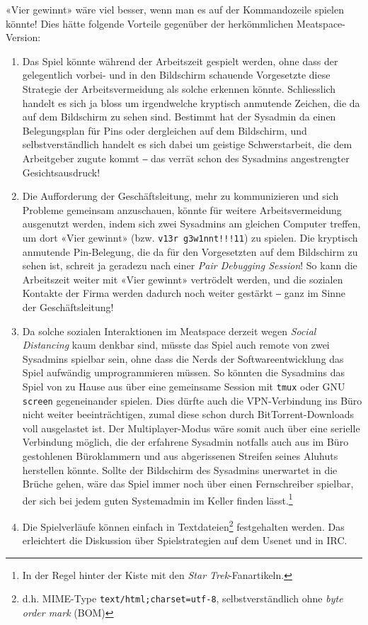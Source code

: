 \documentclass[a4paper,11pt,hidelinks]{scrartcl}
\begin{document}
«Vier gewinnt» wäre viel besser, wenn man es auf der Kommandozeile spielen könnte! Dies hätte folgende Vorteile gegenüber der herkömmlichen Meatspace-Version:

\begin{enumerate}
    \item Das Spiel könnte während der Arbeitszeit gespielt werden, ohne dass der gelegentlich vorbei- und in den Bildschirm schauende Vorgesetzte diese Strategie der Arbeitsvermeidung als solche erkennen könnte. Schliesslich handelt es sich ja bloss um irgendwelche kryptisch anmutende Zeichen, die da auf dem Bildschirm zu sehen sind. Bestimmt hat der Sysadmin da einen Belegungsplan für Pins oder dergleichen auf dem Bildschirm, und selbstverständlich handelt es sich dabei um geistige Schwerstarbeit, die dem Arbeitgeber zugute kommt ‒ das verrät schon des Sysadmins angestrengter Gesichtsausdruck!
    \item Die Aufforderung der Geschäftsleitung, mehr zu kommunizieren und sich Probleme gemeinsam anzuschauen, könnte für weitere Arbeitsvermeidung ausgenutzt werden, indem sich zwei Sysadmins am gleichen Computer treffen, um dort «Vier gewinnt» (bzw. \texttt{v13r g3w1nnt!!!11}) zu spielen. Die kryptisch anmutende Pin-Be\-le\-gung, die da für den Vorgesetzten auf dem Bildschirm zu sehen ist, schreit ja geradezu nach einer \textit{Pair Debugging Session}! So kann die Arbeitszeit weiter mit «Vier gewinnt» vertrödelt werden, und die sozialen Kontakte der Firma werden dadurch noch weiter gestärkt ‒ ganz im Sinne der Geschäftsleitung!
    \item Da solche sozialen Interaktionen im Meatspace derzeit wegen \textit{Social Distancing} kaum denkbar sind, müsste das Spiel auch remote von zwei Sysadmins spielbar sein, ohne dass die Nerds der Softwareentwicklung das Spiel aufwändig umprogrammieren müssen. So könnten die Sysadmins das Spiel von zu Hause aus über eine gemeinsame Session mit \texttt{tmux} oder GNU \texttt{screen} gegeneinander spielen. Dies dürfte auch die VPN-Verbindung ins Büro nicht weiter beeinträchtigen, zumal diese schon durch BitTorrent-Downloads voll ausgelastet ist. Der Multiplayer-Modus wäre somit auch über eine serielle Verbindung möglich, die der erfahrene Sysadmin notfalls auch aus im Büro gestohlenen Büroklammern und aus abgerissenen Streifen seines Aluhuts herstellen könnte. Sollte der Bildschirm des Sysadmins unerwartet in die Brüche gehen, wäre das Spiel immer noch über einen Fernschreiber spielbar, der sich bei jedem guten Systemadmin im Keller finden lässt.\footnote{In der Regel hinter der Kiste mit den \textit{Star Trek}-Fanartikeln.}
    \item Die Spielverläufe können einfach in Textdateien\footnote{d.h. MIME-Type \texttt{text/html;charset=utf-8}, selbstverständlich ohne \textit{byte order mark} (BOM)} festgehalten werden. Das erleichtert die Diskussion über Spielstrategien auf dem Usenet und in IRC.
\end{enumerate}
\end{document}
